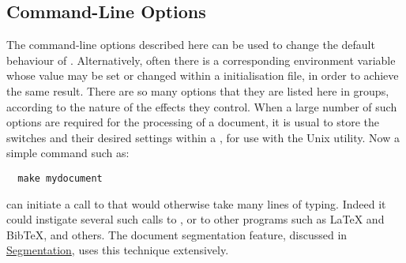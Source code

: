 \subsection{Command-Line Options\label{options}}%
%
%
%
%
%
\html{\\}\noindent
The command-line options described here can be used to change the
default behaviour of \latextohtml. 
Alternatively, often there is a corresponding environment variable
whose value may be set or changed within a  
initialisation file, in order to achieve the same result.\html{\\}
There are so many options that they are listed here in groups, 
according to the nature of the effects they control.
When a large number of such options are required for the processing of a document,
it is usual to store the switches and their desired settings within a ,
for use with the Unix  utility. Now a simple command such as:
\begin{verbatim}
  make mydocument
\end{verbatim}
can initiate a call to  that would otherwise take many lines of typing.
Indeed it could instigate several such calls to \latextohtml, or to other programs
such as \LaTeX{} and Bib\TeX,  and others.
The document segmentation feature, discussed in 
\hyperref{another section}{Section~}{}{Segmentation},
uses this technique extensively.


